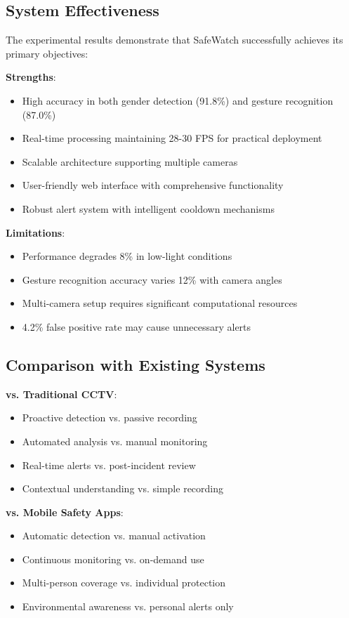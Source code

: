 \documentclass[12pt,a4paper]{article}
\begin{document}
\subsection{System Effectiveness}
The experimental results demonstrate that SafeWatch successfully achieves its primary objectives:

\textbf{Strengths}:
\begin{itemize}
    \item High accuracy in both gender detection (91.8\%) and gesture recognition (87.0\%)
    \item Real-time processing maintaining 28-30 FPS for practical deployment
    \item Scalable architecture supporting multiple cameras
    \item User-friendly web interface with comprehensive functionality
    \item Robust alert system with intelligent cooldown mechanisms
\end{itemize}

\textbf{Limitations}:
\begin{itemize}
    \item Performance degrades 8\% in low-light conditions
    \item Gesture recognition accuracy varies 12\% with camera angles
    \item Multi-camera setup requires significant computational resources
    \item 4.2\% false positive rate may cause unnecessary alerts
\end{itemize}

\subsection{Comparison with Existing Systems}

\textbf{vs. Traditional CCTV}:
\begin{itemize}
    \item Proactive detection vs. passive recording
    \item Automated analysis vs. manual monitoring  
    \item Real-time alerts vs. post-incident review
    \item Contextual understanding vs. simple recording
\end{itemize}

\textbf{vs. Mobile Safety Apps}:
\begin{itemize}
    \item Automatic detection vs. manual activation
    \item Continuous monitoring vs. on-demand use
    \item Multi-person coverage vs. individual protection
    \item Environmental awareness vs. personal alerts only
\end{itemize}
\end{document}

